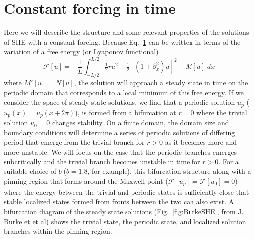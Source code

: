 \documentclass[../main/TimeForcingSHE.tex]{subfiles}
\begin{document}
\section{Constant forcing in time }

Here we will describe the structure and some relevant properties of the  solutions of SHE with a constant forcing.   Because Eq.~\ref{} can be written in terms of the variation of a free energy (or Lyaponov functional)
\begin{equation}
\mathcal{F}[u]=-\frac{1}{L}\int_{-L/2}^{L/2}\tfrac{1}{2}r u^2-\tfrac{1}{2}\left[(1+\partial_x^2)u\right]^2-M[u] \;dx
\end{equation}
where $M'[u]=N[u]$, the solution will approach a steady state in time on the periodic domain that corresponds to a local minimum of this free energy.  If we consider the space of steady-state solutions, we find that a periodic solution $u_p$ ($u_p(x)=u_p(x+2\pi)$), is formed from a bifurcation at $r=0$ where the trivial solution $u_0=0$ changes stability.  On a finite domain, the domain size and boundary conditions will determine a series of periodic solutions of differing period that emerge from the trivial branch for $r>0$ as it becomes more and more unstable.   We will focus on the case that the periodic branches  emerges subcritically and the trivial branch becomes unstable in time for $r>0$.  For a suitable choice of $b$ ($b=1.8$, for example), this bifurcation structure along with a pinning region that forms around the Maxwell point ($\mathcal{F}[u_p]=\mathcal{F}[u_0]=0$) where the energy between the trivial and periodic states is sufficiently close that stable localized states formed from fronts between the two can also exist.  A bifurcation diagram of the steady state solutions (Fig.~\ref{fig:BurkeSHE}, from J. Burke et et al) shows the trivial state, the periodic state, and localized solution branches within the pinning region.  

\FIGshesnaking
\end{document}
